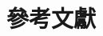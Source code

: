 \documentclass[final,3p]{elsarticle}
\begin{document}


%  
% 
% 
% 
% 
% 
% 
% 
% 
% 
% 
% 
% 

\section{參考文獻}


	
\end{document}
